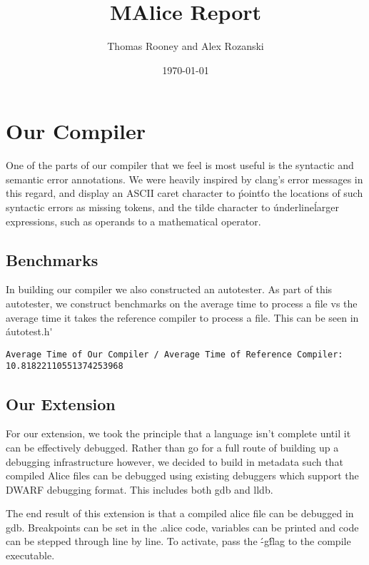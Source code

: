 \documentclass[a4wide, 11pt]{article}
\begin{document}
\title{MAlice Report}

\author{Thomas Rooney and Alex Rozanski}

\date{\today}

\maketitle

\section{Our Compiler}

One of the parts of our compiler that we feel is most useful is the syntactic and semantic error annotations. We were heavily inspired by clang's error messages in this regard, and display an ASCII caret character to \'point\' to the locations of such syntactic errors as missing tokens, and the tilde character to \'underline\' larger expressions, such as operands to a mathematical operator.

\subsection{Benchmarks}

In building our compiler we also constructed an autotester. As part of this autotester, we construct benchmarks on the average time to process a file vs the average time it takes the reference compiler to process a file. This can be seen in \'autotest.h\'
\begin{verbatim}
Average Time of Our Compiler / Average Time of Reference Compiler: 10.81822110551374253968
\end{verbatim}

\subsection{Our Extension}

For our extension, we took the principle that a language isn't complete until it can be effectively debugged. Rather than go for a full route of building up a debugging infrastructure however, we decided to build in metadata such that compiled Alice files can be debugged using existing debuggers which support the DWARF debugging format. This includes both gdb and lldb.

The end result of this extension is that a compiled alice file can be debugged in gdb. Breakpoints can be set in the .alice code, variables can be printed and code can be stepped through line by line. To activate, pass the \'-g\' flag to the compile executable.
\end{document}
